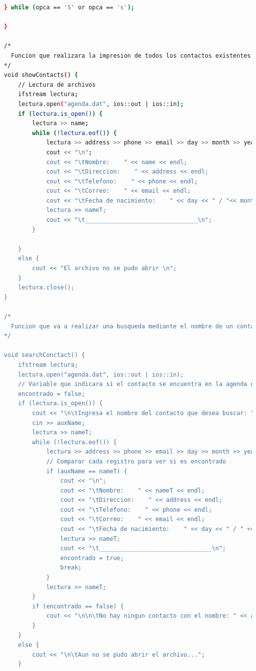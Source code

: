 \documentclass[12pt]{article}
\begin{document}
\begin{lstlisting}[language=bash,frame=single,style=CStyle]
    } while (opca == 'S' or opca == 's');

}

/*
  Funcion que realizara la impresion de todos los contactos existentes
*/
void showContacts() {
    // Lectura de archivos
    ifstream lectura;
    lectura.open("agenda.dat", ios::out | ios::in);
    if (lectura.is_open()) {
        lectura >> name;
        while (!lectura.eof()) {
            lectura >> address >> phone >> email >> day >> month >> year;
            cout << "\n";
            cout << "\tNombre:    " << name << endl;
            cout << "\tDireccion:    " << address << endl;
            cout << "\tTelefono:    " << phone << endl;
            cout << "\tCorreo:    " << email << endl;
            cout << "\tFecha de nacimiento:    " << day << " / "<< month<< " / "<< year<<endl;
            lectura >> nameT;
            cout << "\t________________________________\n";
        }

    }
    else {
        cout << "El archivo no se pudo abrir \n";
    }
    lectura.close();
}

/*
  Funcion que va a realizar una busqueda mediante el nombre de un contacto si existe lo muestra
*/

void searchConctact() {
    ifstream lectura;
    lectura.open("agenda.dat", ios::out | ios::in);
    // Variable que indicara si el contacto se encuentra en la agenda o no
    encontrado = false;
    if (lectura.is_open()) {
        cout << "\n\tIngresa el nombre del contacto que desea buscar: ";
        cin >> auxName;
        lectura >> nameT;
        while (!lectura.eof()) {
            lectura >> address >> phone >> email >> day >> month >> year;
            // Comparar cada registro para ver si es encontrado
            if (auxName == nameT) {
                cout << "\n";
                cout << "\tNombre:    " << nameT << endl;
                cout << "\tDireccion:    " << address << endl;
                cout << "\tTelefono:    " << phone << endl;
                cout << "\tCorreo:    " << email << endl;
                cout << "\tFecha de nacimiento:    " << day << " / " << month << " / " << year << endl;
                lectura >> nameT;
                cout << "\t________________________________\n";
                encontrado = true;
                break;
            }
            lectura >> nameT;
        }
        if (encontrado == false) {
            cout << "\n\n\tNo hay ningun contacto con el nombre: " << auxName << "\n\n\t\t\t";
        }
    }
    else {
        cout << "\n\tAun no se pudo abrir el archivo...";
    }


\end{lstlisting}
\end{document}
